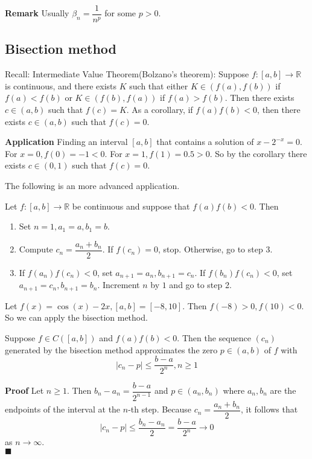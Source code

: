 \documentclass[main.tex]{subfiles}
\begin{document}
\par \noindent \textbf{Remark} Usually $\beta_n = \dfrac{1}{n^p}$ for some $p>0$. 
\subsection{Bisection method}
\par Recall: Intermediate Value Theorem(Bolzano's theorem): Suppose $f:[a, b] \rightarrow \mathbb{R}$ is continuous, and there exists $K$ such that either $K\in (f(a), f(b))$ if $f(a) < f(b)$ or $K\in (f(b), f(a))$ if $f(a) > f(b)$. Then there exists $c\in (a, b)$ such that $f(c) = K$. As a corollary, if $f(a)f(b)<0$, then there exists $c\in (a, b)$ such that $f(c) = 0$. 
\par \noindent \textbf{Application} Finding an interval $[a, b]$ that contains a solution of $x - 2^{-x} = 0$. For $x = 0, f(0) = -1 < 0$. For $x = 1, f(1) = 0.5 > 0$. So by the corollary there exists $c\in (0, 1)$ such that $f(c) = 0$.
\par The following is an more advanced application. 
\begin{algorithm}
    Let $f:[a, b] \rightarrow \mathbb{R}$ be continuous and suppose that $f(a)f(b) < 0$. Then
    \begin{enumerate}
        \item Set $n = 1, a_1 = a, b_1 = b$.
        \item Compute $c_n = \dfrac{a_n + b_n}{2}$. If $f(c_n) = 0$, stop. Otherwise, go to step 3.
        \item If $f(a_n)f(c_n) < 0$, set $a_{n+1} = a_n, b_{n+1} = c_n$. If $f(b_n)f(c_n) < 0$, set $a_{n+1} = c_n, b_{n+1} = b_n$. Increment $n$ by $1$ and go to step 2.
    \end{enumerate}
\end{algorithm}

\begin{example}
    Let $f(x) = \cos(x) - 2x, [a, b] = [-8, 10]$. Then $f(-8) > 0, f(10) < 0$. So we can apply the bisection method.
\end{example}
\begin{theorem}
    Suppose $f\in C([a, b])$ and $f(a) f(b) < 0$. Then the sequence $(c_n)$ generated by the bisection method approximates the zero $p\in (a, b)$ of $f$ with  
    \begin{equation}
        |c_n - p| \le \dfrac{b - a}{2^{n}}, n \ge 1 
    \end{equation}
\end{theorem}
\par \noindent \textbf{Proof} Let $n \ge 1$. Then $b_n - a_n = \dfrac{b - a}{2^{n-1}}$ and $p\in (a_n, b_n)$ where $a_n, b_n$ are the endpoints of the interval at the $n$-th step. Because $c_n = \dfrac{a_n + b_n}{2}$, it follows that
\begin{equation}
    |c_n - p| \le \dfrac{b_n - a_n}{2} = \dfrac{b - a}{2^n} \to 0  
\end{equation}
as $n\to \infty$. 
\\ \null \hfill $\blacksquare$ 
\end{document}
